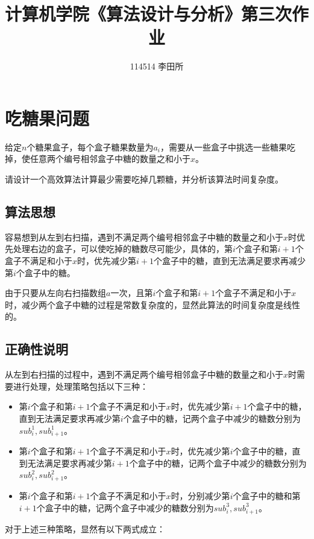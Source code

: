 \documentclass{article}
\title{\heiti 计算机学院《算法设计与分析》第三次作业}
\author{114514 李田所}
\begin{document}
\maketitle

\section{吃糖果问题}

给定$n$个糖果盒子，每个盒子糖果数量为$a_i$，需要从一些盒子中挑选一些糖果吃掉，使任意两个编号相邻盒子中糖的数量之和小于$x$。

请设计一个高效算法计算最少需要吃掉几颗糖，并分析该算法时间复杂度。

\subsection{算法思想}

容易想到从左到右扫描，遇到不满足两个编号相邻盒子中糖的数量之和小于$x$时优先处理右边的盒子，可以使吃掉的糖数尽可能少，具体的，第$i$个盒子和第$i+1$个盒子不满足和小于$x$时，优先减少第$i+1$个盒子中的糖，直到无法满足要求再减少第$i$个盒子中的糖。

由于只要从左向右扫描数组$a$一次，且第$i$个盒子和第$i+1$个盒子不满足和小于$x$时，减少两个盒子中糖的过程是常数复杂度的，显然此算法的时间复杂度是线性的。

\subsection{正确性说明}

从左到右扫描的过程中，遇到不满足两个编号相邻盒子中糖的数量之和小于$x$时需要进行处理，处理策略包括以下三种：

\begin{itemize}[itemindent=3em]
    \item 第$i$个盒子和第$i+1$个盒子不满足和小于$x$时，优先减少第$i+1$个盒子中的糖，直到无法满足要求再减少第$i$个盒子中的糖，记两个盒子中减少的糖数分别为$sub^1_i,sub^1_{i+1}$。
    \item 第$i$个盒子和第$i+1$个盒子不满足和小于$x$时，优先减少第$i$个盒子中的糖，直到无法满足要求再减少第$i+1$个盒子中的糖，记两个盒子中减少的糖数分别为$sub^2_i,sub^2_{i+1}$。
    \item 第$i$个盒子和第$i+1$个盒子不满足和小于$x$时，分别减少第$i$个盒子中的糖和第$i+1$个盒子中的糖，记两个盒子中减少的糖数分别为$sub^3_i,sub^3_{i+1}$。
\end{itemize}

对于上述三种策略，显然有以下两式成立：
\end{document}
